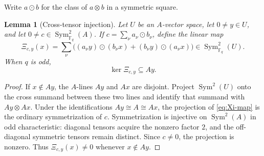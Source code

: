 \documentclass[11pt]{article}
\newtheorem{lemma}[lemma]{Lemma}
\newcommand{\F}{\mathbb F}
\newcommand{\Sym}{\operatorname{Sym}}
\begin{document}
Write $a\mathbin\odot b$ for the class of $a\otimes b$ in a symmetric square.

\begin{lemma}[Cross-tensor injection]\label{lem:cross-tensor-injection}
Let $U$ be an $A$-vector space, let $0\ne y\in U$, and let
$0\ne c\in\Sym^2_{\F_q}(A)$.  If
$c=\sum_\nu a_\nu\mathbin\odot b_\nu$, define the linear map
\begin{equation}\label{eq:Xi-map}
 \Xi_{c,y}(x)=
 \sum_\nu\bigl((a_\nu y)\mathbin\odot(b_\nu x)
              +(b_\nu y)\mathbin\odot(a_\nu x)\bigr)
 \in\Sym^2_{\F_q}(U).
\end{equation}
When $q$ is odd,
\begin{equation}\label{eq:Xi-kernel}
 \ker\Xi_{c,y}\subseteq Ay.
\end{equation}
\end{lemma}

\begin{proof}
If $x\notin Ay$, the $A$-lines $Ay$ and $Ax$ are disjoint.  Project
$\Sym^2(U)$ onto the cross summand between these two lines and identify that
summand with $Ay\otimes Ax$.  Under the identifications $Ay\cong A\cong Ax$,
the projection of \eqref{eq:Xi-map} is the ordinary symmetrization of $c$.
Symmetrization is injective on $\Sym^2(A)$ in odd characteristic: diagonal
tensors acquire the nonzero factor $2$, and the off-diagonal symmetric tensors
remain distinct.  Since $c\ne0$, the projection is nonzero.  Thus
$\Xi_{c,y}(x)\ne0$ whenever $x\notin Ay$.
\end{proof}
\end{document}
